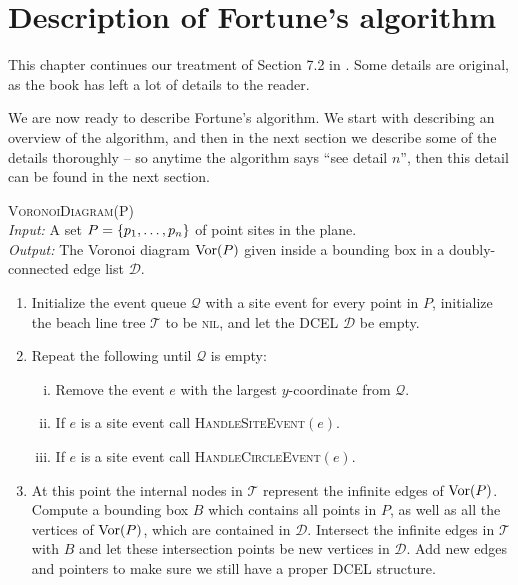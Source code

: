 \chapter{Description of Fortune's algorithm}

This chapter continues our treatment of Section 7.2 in \cite{CompGeo}. Some details are original, as the book has left a lot of details to the reader.

We are now ready to describe Fortune's algorithm. We start with describing an overview of the algorithm, and then in the next section we describe some of the details thoroughly -- so anytime the algorithm says ``see detail $n$'', then this detail can be found in the next section.

\begin{alg} \label{alg:fortune} \textsc{VoronoiDiagram}(P) \\
\textit{Input:} A set $P = \{p_1, \ldots, p_n\}$ of point sites in the plane. \\
\textit{Output:} The Voronoi diagram $\operatorname{Vor}(P)$ given inside a bounding box in a doubly-connected edge list $\mathcal{D}$.
\begin{enumerate}
    \item Initialize the event queue $\mathcal{Q}$ with a site event for every point in $P$, initialize the beach line tree $\mathcal{T}$ to be \textsc{nil}, and let the DCEL $\mathcal{D}$ be empty.
    \item Repeat the following until $\mathcal{Q}$ is empty:
    \begin{enumerate}[i.]
        \item Remove the event $e$ with the largest $y$-coordinate from $\mathcal{Q}$.
        \item If $e$ is a site event call \textsc{HandleSiteEvent}$(e)$.
        \item If $e$ is a site event call \textsc{HandleCircleEvent}$(e)$.
    \end{enumerate}
    \item At this point the internal nodes in $\mathcal{T}$ represent the infinite edges of $\operatorname{Vor}(P)$. Compute a bounding box $B$ which contains all points in $P$, as well as all the vertices of $\operatorname{Vor}(P)$, which are contained in $\mathcal{D}$. Intersect the infinite edges in $\mathcal{T}$ with $B$ and let these intersection points be new vertices in $\mathcal{D}$. Add new edges and pointers to make sure we still have a proper DCEL structure.
\end{enumerate}
\end{alg}

